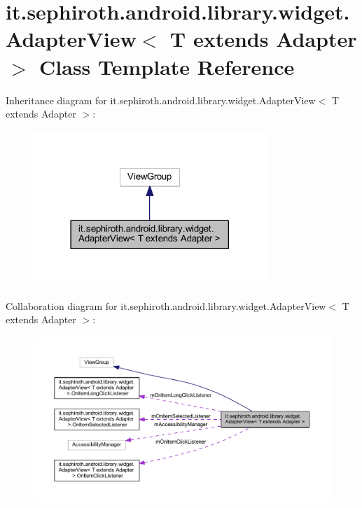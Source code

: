 \hypertarget{classit_1_1sephiroth_1_1android_1_1library_1_1widget_1_1_adapter_view}{}\section{it.\+sephiroth.\+android.\+library.\+widget.\+Adapter\+View$<$ T extends Adapter $>$ Class Template Reference}
\label{classit_1_1sephiroth_1_1android_1_1library_1_1widget_1_1_adapter_view}


Inheritance diagram for it.\+sephiroth.\+android.\+library.\+widget.\+Adapter\+View$<$ T extends Adapter $>$\+:
\nopagebreak
\begin{figure}[H]
\begin{center}
\leavevmode
\includegraphics[width=249pt]{classit_1_1sephiroth_1_1android_1_1library_1_1widget_1_1_adapter_view__inherit__graph}
\end{center}
\end{figure}


Collaboration diagram for it.\+sephiroth.\+android.\+library.\+widget.\+Adapter\+View$<$ T extends Adapter $>$\+:
\nopagebreak
\begin{figure}[H]
\begin{center}
\leavevmode
\includegraphics[width=350pt]{classit_1_1sephiroth_1_1android_1_1library_1_1widget_1_1_adapter_view__coll__graph}
\end{center}
\end{figure}
